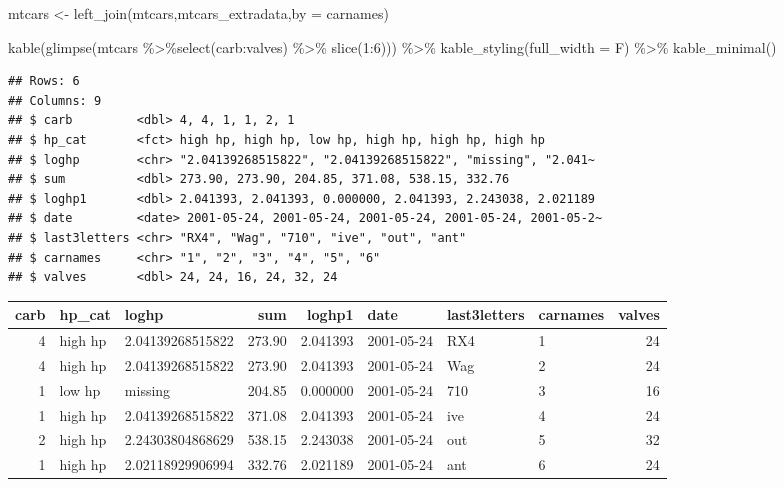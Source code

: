 \documentclass[
]{article}
\newenvironment{Shaded}{\begin{snugshade}}{\end{snugshade}}
\newcommand{\AttributeTok}[1]{\textcolor[rgb]{0.77,0.63,0.00}{#1}}
\newcommand{\DecValTok}[1]{\textcolor[rgb]{0.00,0.00,0.81}{#1}}
\newcommand{\FunctionTok}[1]{\textcolor[rgb]{0.00,0.00,0.00}{#1}}
\newcommand{\NormalTok}[1]{#1}
\newcommand{\OtherTok}[1]{\textcolor[rgb]{0.56,0.35,0.01}{#1}}
\newcommand{\SpecialCharTok}[1]{\textcolor[rgb]{0.00,0.00,0.00}{#1}}
\newcommand{\StringTok}[1]{\textcolor[rgb]{0.31,0.60,0.02}{#1}}
\begin{document}
\begin{Shaded}
\begin{Highlighting}[]
\NormalTok{mtcars }\OtherTok{\textless{}{-}} \FunctionTok{left\_join}\NormalTok{(mtcars,mtcars\_extradata,}\AttributeTok{by =} \StringTok{\textquotesingle{}carnames\textquotesingle{}}\NormalTok{)}

\FunctionTok{kable}\NormalTok{(}\FunctionTok{glimpse}\NormalTok{(mtcars }\SpecialCharTok{\%\textgreater{}\%}\FunctionTok{select}\NormalTok{(carb}\SpecialCharTok{:}\NormalTok{valves) }\SpecialCharTok{\%\textgreater{}\%}  \FunctionTok{slice}\NormalTok{(}\DecValTok{1}\SpecialCharTok{:}\DecValTok{6}\NormalTok{))) }\SpecialCharTok{\%\textgreater{}\%}
  \FunctionTok{kable\_styling}\NormalTok{(}\AttributeTok{full\_width =}\NormalTok{ F) }\SpecialCharTok{\%\textgreater{}\%}
  \FunctionTok{kable\_minimal}\NormalTok{()}
\end{Highlighting}
\end{Shaded}

\begin{verbatim}
## Rows: 6
## Columns: 9
## $ carb         <dbl> 4, 4, 1, 1, 2, 1
## $ hp_cat       <fct> high hp, high hp, low hp, high hp, high hp, high hp
## $ loghp        <chr> "2.04139268515822", "2.04139268515822", "missing", "2.041~
## $ sum          <dbl> 273.90, 273.90, 204.85, 371.08, 538.15, 332.76
## $ loghp1       <dbl> 2.041393, 2.041393, 0.000000, 2.041393, 2.243038, 2.021189
## $ date         <date> 2001-05-24, 2001-05-24, 2001-05-24, 2001-05-24, 2001-05-2~
## $ last3letters <chr> "RX4", "Wag", "710", "ive", "out", "ant"
## $ carnames     <chr> "1", "2", "3", "4", "5", "6"
## $ valves       <dbl> 24, 24, 16, 24, 32, 24
\end{verbatim}

\begin{table}
\centering
\begin{tabular}{r|l|l|r|r|l|l|l|r}
\hline
carb & hp\_cat & loghp & sum & loghp1 & date & last3letters & carnames & valves\\
\hline
4 & high hp & 2.04139268515822 & 273.90 & 2.041393 & 2001-05-24 & RX4 & 1 & 24\\
\hline
4 & high hp & 2.04139268515822 & 273.90 & 2.041393 & 2001-05-24 & Wag & 2 & 24\\
\hline
1 & low hp & missing & 204.85 & 0.000000 & 2001-05-24 & 710 & 3 & 16\\
\hline
1 & high hp & 2.04139268515822 & 371.08 & 2.041393 & 2001-05-24 & ive & 4 & 24\\
\hline
2 & high hp & 2.24303804868629 & 538.15 & 2.243038 & 2001-05-24 & out & 5 & 32\\
\hline
1 & high hp & 2.02118929906994 & 332.76 & 2.021189 & 2001-05-24 & ant & 6 & 24\\
\hline
\end{tabular}
\end{table}
\end{document}
